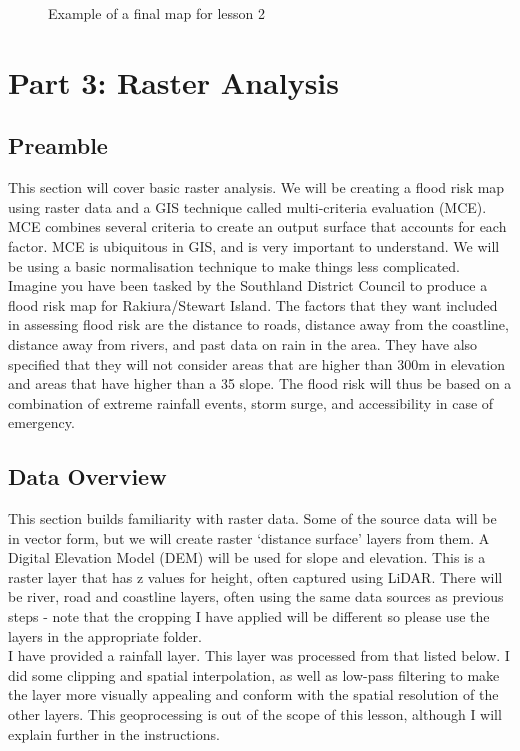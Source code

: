 \documentclass{article}
\begin{document}
\begin{figure}[h]
  \centering
  \caption{Example of a final map for lesson 2}
  \label{2_map}
\end{figure}

\pagebreak
\section{Part 3: Raster Analysis}
\subsection{Preamble}
This section will cover basic raster analysis. We will be creating a flood risk map using raster data and a GIS technique called multi-criteria evaluation (MCE). MCE combines several criteria to create an output surface that accounts for each factor. MCE is ubiquitous in GIS, and is very important to understand. We will be using a basic normalisation technique to make things less complicated.\\

Imagine you have been tasked by the Southland District Council to produce a flood risk map for Rakiura/Stewart Island. The factors that they want included in assessing flood risk are the distance to roads, distance away from the coastline, distance away from rivers, and past data on rain in the area. They have also specified that they will not consider areas that are higher than 300m in elevation and areas that have higher than a 35\textdegree{} slope. The flood risk will thus be based on a combination of extreme rainfall events, storm surge, and accessibility in case of emergency.

\subsection{Data Overview}
This section builds familiarity with raster data. Some of the source data will be in vector form, but we will create raster `distance surface' layers from them. A Digital Elevation Model (DEM) will be used for slope and elevation. This is a raster layer that has z values for height, often captured using LiDAR. There will be river, road and coastline layers, often using the same data sources as previous steps - note that the cropping I have applied will be different so please use the layers in the appropriate folder. \\

I have provided a rainfall layer. This layer was processed from that listed below. I did some clipping and spatial interpolation, as well as low-pass filtering to make the layer more visually appealing and conform with the spatial resolution of the other layers. This geoprocessing is out of the scope of this lesson, although I will explain further in the instructions.
\end{document}

